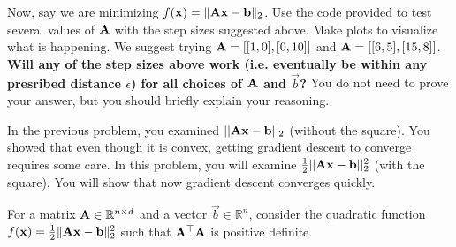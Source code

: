\documentclass[11pt]{article}
\begin{document}
\begin{Parts}
\Part Now, say we are minimizing $f(\boldsymbol{\mathbf{x}}) = \|\mathbf{A}\boldsymbol{\mathbf{x}}-\boldsymbol{\mathbf{b}}\|_2$. Use the code provided to test several values of $\mathbf{A}$ with the step sizes suggested above. Make plots to visualize what is happening. We suggest trying $\mathbf{A} = [[1, 0], [0, 10]]$ and $\mathbf{A} = [[6, 5], [15, 8]]$. \textbf{Will any of the step sizes above work (i.e. eventually be within any presribed distance $\epsilon$) for all choices of $\mathbf{A}$ and $\vec b$?} You do not need to prove your answer, but you should briefly explain your reasoning.



\end{Parts}


\newcommand{\CC}{\rho}  
In the previous problem, you examined $||\mathbf{A}\boldsymbol{\mathbf{x}}-\boldsymbol{\mathbf{b}}||_2$ (without the square).
You showed that even though it is convex, getting gradient descent to converge
requires some care.
In this problem, you will examine $\frac{1}{2}||\mathbf{A}\boldsymbol{\mathbf{x}}-\boldsymbol{\mathbf{b}}||_2^2$
(with the square). You will show that now gradient descent converges quickly.

For a matrix $\mathbf{A} \in \mathbb{R}^{n \times d}$ and a vector $\vec{b} \in \mathbb{R}^n$,
consider the quadratic function $f(\boldsymbol{\mathbf{x}}) = \frac{1}{2} \| \mathbf{A}\boldsymbol{\mathbf{x}}-\boldsymbol{\mathbf{b}} \|_2^2$
such that $\mathbf{A}^\top\mathbf{A}$ is positive definite.
\end{document}
